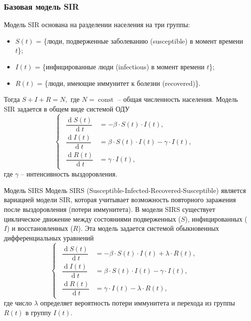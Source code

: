 \documentclass[notheorems]{beamer}
\renewcommand{\d}{\operatorname{d}}
\begin{document}

\begin{frame}
	\frametitle{Базовая модель SIR}
	Модель SIR основана на разделении населения на три группы: 
	\begin{itemize}
	\item $S(t)$ = \{люди, подверженные заболеванию (susceptible) в момент времени $t$\};
	\item $I(t)$ = \{инфицированные люди (infectious) в момент времени $t$\};
	\item $R(t)$ = \{люди, имеющие иммунитет к болезни (recovered)\}.
	\end{itemize}
	Тогда $S + I + R = N,$ где $N=\operatorname{const}$ -- общая численность населения.
	Модель SIR задается в общем виде системой ОДУ 
	\begin{equation}
		\left\{ 
		\begin{gathered} 
			\begin{aligned}
				\dfrac {\d S(t)}{\d t} &= -\beta \cdot S(t) \cdot I(t),\\
				\dfrac{\d I(t)}{\d t} &= \beta \cdot S(t)\cdot I(t) - \gamma\cdot I(t),\\
				\dfrac{\d R(t)}{\d t} &= \gamma\cdot I(t),
			\end{aligned}
		\end{gathered} 
		\right.
	\end{equation}
	где $\gamma$ -- интенсивность выздоровления.
\end{frame}


\begin{frame}{Модель SIRS}
	 Модель SIRS (Susceptible-Infected-Recovered-Susceptible) является вариацией модели SIR, которая учитывает возможность повторного заражения после выздоровления (потери иммунитета). В модели SIRS существует циклическое движение между состояниями подверженных ($S$), инфицированных ($I$) и восстановленных ($R$). Эта модель задается системой обыкновенных дифференциальных уравнений
	\begin{equation}
		\left\{ 
		\begin{gathered} 
			\begin{aligned}
				\dfrac {\d S(t)}{\d t} &= -\beta \cdot S(t) \cdot I(t) + \lambda \cdot R(t),\\
				\dfrac{\d I(t)}{\d t} &= \beta \cdot S(t)\cdot I(t) - \gamma\cdot I(t),\\
				\dfrac{\d R(t)}{\d t} &= \gamma\cdot I(t) - \lambda \cdot R(t),
			\end{aligned}
		\end{gathered} 
		\right.
	\end{equation}
	где число $\lambda$ определяет вероятность потери иммунитета и перехода из группы $R(t)$ в группу $I(t)$.
\end{frame}
\end{document}
